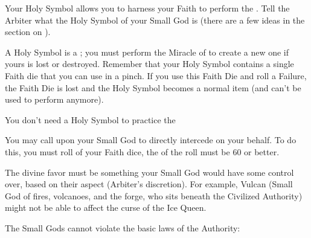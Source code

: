 {Your Holy Symbol allows you to harness your Faith to perform the .  Tell the Arbiter what the Holy Symbol of your Small God is (there are a few ideas in the section on ).

A Holy Symbol is a ; you must perform the Miracle of  to create a new one if yours is lost or destroyed.  Remember that your Holy Symbol contains a single Faith die that you can use in a pinch.  If you use this Faith Die and roll a Failure, the Faith Die is lost and the Holy Symbol becomes a normal item (and can't be used to perform  anymore).

You don't need a Holy Symbol to practice the 



You may call upon your Small God to directly intercede on your behalf.  To do this, you must roll  of your Faith dice, the \SUMDICE of the roll must be 60 or better.

The divine favor must be something your Small God would have some control over, based on their aspect (Arbiter's discretion).  For example, Vulcan (Small God of fires, volcanoes, and the forge, who sits beneath the Civilized Authority) might not be able to affect the curse of the Ice Queen.  

The Small Gods cannot violate the basic laws of the Authority:

}
